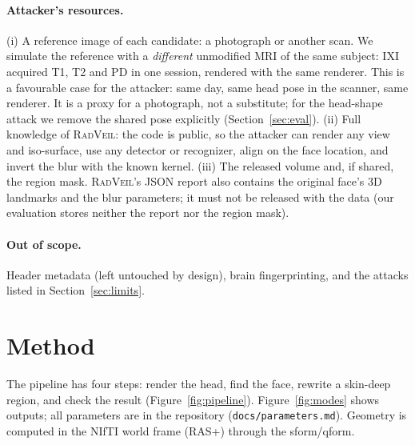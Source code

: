 \documentclass[11pt]{article}
\newcommand{\rv}{\textsc{RadVeil}}
\newcommand{\code}[1]{\texttt{#1}}
\begin{document}
\paragraph{Attacker's resources.} (i) A reference image of each candidate:
a photograph or another scan. We simulate the reference with a
\emph{different} unmodified MRI of the same subject: IXI acquired T1, T2 and
PD in one session, rendered with the same renderer. This is a favourable
case for the attacker: same day, same head pose in the scanner, same
renderer. It is a proxy for a photograph, not a substitute; for the
head-shape attack we remove the shared pose explicitly
(Section~\ref{sec:eval}). (ii) Full knowledge of \rv{}: the code is public, so
the attacker can render any view and iso-surface, use any detector or
recognizer, align on the face location, and invert the blur with the known
kernel. (iii) The released volume and, if shared, the region mask. \rv{}'s
JSON report also contains the original face's 3D landmarks and the blur
parameters; it must not be released with the data (our evaluation stores
neither the report nor the region mask).

\paragraph{Out of scope.} Header metadata (left untouched by design), brain
fingerprinting, and the attacks listed in Section~\ref{sec:limits}.

\section{Method}
\label{sec:method}

The pipeline has four steps: render the head, find the face, rewrite a
skin-deep region, and check the result (Figure~\ref{fig:pipeline}).
Figure~\ref{fig:modes} shows outputs; all parameters are in the repository
(\code{docs/parameters.md}). Geometry is computed in the NIfTI world frame
(RAS+) through the sform/qform.
\end{document}
